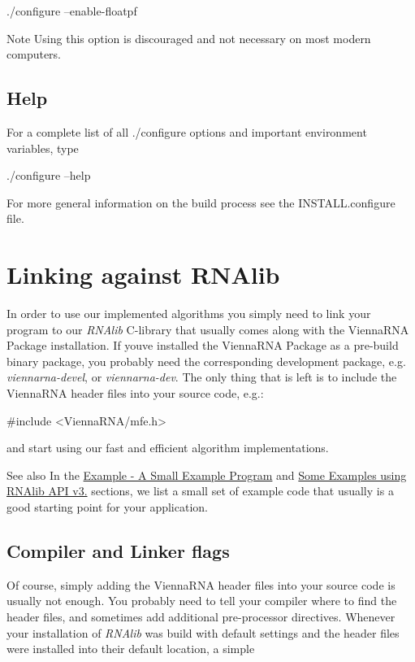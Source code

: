 \begin{DoxyVerb}./configure --enable-floatpf
\end{DoxyVerb}


\begin{DoxyNote}{Note}
Using this option is discouraged and not necessary on most modern computers.
\end{DoxyNote}
\hypertarget{install_config_help}{}\subsection{Help}\label{install_config_help}
For a complete list of all ./configure options and important environment variables, type

\begin{DoxyVerb}./configure --help
\end{DoxyVerb}


For more general information on the build process see the I\+N\+S\+T\+A\+L\+L.\+configure file.\hypertarget{install_linking}{}\section{Linking against R\+N\+Alib}\label{install_linking}
In order to use our implemented algorithms you simply need to link your program to our {\itshape R\+N\+Alib} C-\/library that usually comes along with the Vienna\+R\+NA Package installation. If you\textquotesingle{}ve installed the Vienna\+R\+NA Package as a pre-\/build binary package, you probably need the corresponding development package, e.\+g. {\itshape viennarna-\/devel}, or {\itshape viennarna-\/dev}. The only thing that is left is to include the Vienna\+R\+NA header files into your source code, e.\+g.\+:

\begin{DoxyVerb}#include <ViennaRNA/mfe.h>
\end{DoxyVerb}


and start using our fast and efficient algorithm implementations.

\begin{DoxySeeAlso}{See also}
In the \hyperlink{mp_example}{Example -\/ A Small Example Program} and \hyperlink{newAPI_newAPI_examples}{Some Examples using R\+N\+Alib A\+PI v3.} sections, we list a small set of example code that usually is a good starting point for your application.
\end{DoxySeeAlso}
\hypertarget{install_linking_flags}{}\subsection{Compiler and Linker flags}\label{install_linking_flags}
Of course, simply adding the Vienna\+R\+NA header files into your source code is usually not enough. You probably need to tell your compiler where to find the header files, and sometimes add additional pre-\/processor directives. Whenever your installation of {\itshape R\+N\+Alib} was build with default settings and the header files were installed into their default location, a simple

